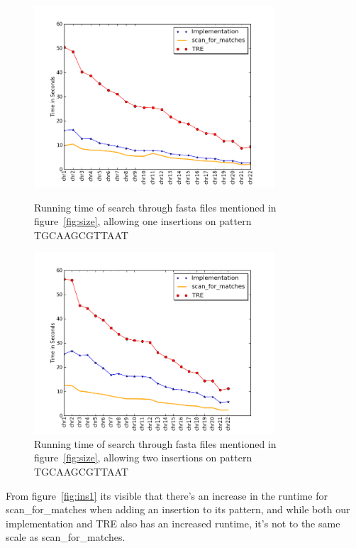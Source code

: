 \begin{figure}[h!]
\begin{minipage}[b]{0.5\linewidth}
\centering
\includegraphics[width=0.8\textwidth]{Benchmarking/1ins.png}
\caption{Running time of search through fasta files mentioned in figure~\ref{fig:size},  allowing one insertions on pattern TGCAAGCGTTAAT}
\label{fig:ins1}
\end{minipage}
\hspace{0.25cm}
\begin{minipage}[b]{0.5\linewidth}
\centering
\includegraphics[width=0.8\textwidth]{Benchmarking/2ins.png}
\caption{Running time of search through fasta files mentioned in figure~\ref{fig:size},  allowing two insertions on pattern TGCAAGCGTTAAT}
\label{fig:ins2}
\end{minipage}
\end{figure}


From figure~\ref{fig:ins1} its visible that there's an increase in the runtime for scan\_for\_matches when adding an insertion to its pattern, and while both our implementation and TRE also has an increased runtime, it's not to the same scale as scan\_for\_matches.


